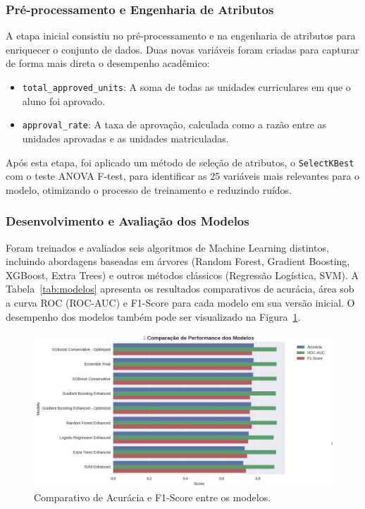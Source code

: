 \documentclass[12pt]{article}
\begin{document}
\subsubsection{Pré-processamento e Engenharia de Atributos}
A etapa inicial consistiu no pré-processamento e na engenharia de atributos para enriquecer o conjunto de dados. Duas novas variáveis foram criadas para capturar de forma mais direta o desempenho acadêmico:
\begin{itemize}
    \item \texttt{total\_approved\_units}: A soma de todas as unidades curriculares em que o aluno foi aprovado.
    \item \texttt{approval\_rate}: A taxa de aprovação, calculada como a razão entre as unidades aprovadas e as unidades matriculadas.
\end{itemize}
Após esta etapa, foi aplicado um método de seleção de atributos, o \texttt{SelectKBest} com o teste ANOVA F-test, para identificar as 25 variáveis mais relevantes para o modelo, otimizando o processo de treinamento e reduzindo ruídos.

\subsubsection{Desenvolvimento e Avaliação dos Modelos}
Foram treinados e avaliados seis algoritmos de Machine Learning distintos, incluindo abordagens baseadas em árvores (Random Forest, Gradient Boosting, XGBoost, Extra Trees) e outros métodos clássicos (Regressão Logística, SVM). A Tabela~\ref{tab:modelos} apresenta os resultados comparativos de acurácia, área sob a curva ROC (ROC-AUC) e F1-Score para cada modelo em sua versão inicial. O desempenho dos modelos também pode ser visualizado na Figura~\ref{fig:comparacao_modelos}.

\begin{figure}[h!]
\centering
\includegraphics[width=1.07\textwidth]{images/comparacao_modelos.jpg}
\caption{Comparativo de Acurácia e F1-Score entre os modelos.}
\label{fig:comparacao_modelos}
\end{figure}
\end{document}
